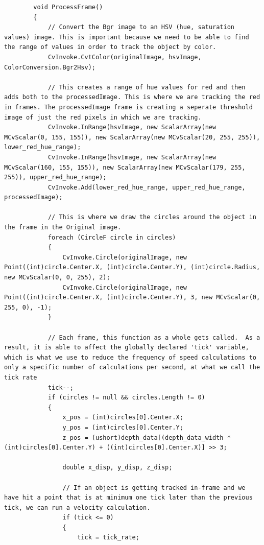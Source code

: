 \documentclass[onecolumn, draftclsnofoot,10pt, compsoc]{IEEEtran}
\begin{document}
\begin{lstlisting}
        void ProcessFrame()
        {
            // Convert the Bgr image to an HSV (hue, saturation values) image. This is important because we need to be able to find the range of values in order to track the object by color.
            CvInvoke.CvtColor(originalImage, hsvImage, ColorConversion.Bgr2Hsv);

            // This creates a range of hue values for red and then adds both to the processedImage. This is where we are tracking the red in frames. The processedImage frame is creating a seperate threshold image of just the red pixels in which we are tracking.
            CvInvoke.InRange(hsvImage, new ScalarArray(new MCvScalar(0, 155, 155)), new ScalarArray(new MCvScalar(20, 255, 255)), lower_red_hue_range);
            CvInvoke.InRange(hsvImage, new ScalarArray(new MCvScalar(160, 155, 155)), new ScalarArray(new MCvScalar(179, 255, 255)), upper_red_hue_range);
            CvInvoke.Add(lower_red_hue_range, upper_red_hue_range, processedImage);

            // This is where we draw the circles around the object in the frame in the Original image.
            foreach (CircleF circle in circles)
            {
                CvInvoke.Circle(originalImage, new Point((int)circle.Center.X, (int)circle.Center.Y), (int)circle.Radius, new MCvScalar(0, 0, 255), 2);
                CvInvoke.Circle(originalImage, new Point((int)circle.Center.X, (int)circle.Center.Y), 3, new MCvScalar(0, 255, 0), -1);
            }

            // Each frame, this function as a whole gets called.  As a result, it is able to affect the globally declared 'tick' variable, which is what we use to reduce the frequency of speed calculations to only a specific number of calculations per second, at what we call the tick rate
            tick--;
            if (circles != null && circles.Length != 0)
            {
                x_pos = (int)circles[0].Center.X;
                y_pos = (int)circles[0].Center.Y;
                z_pos = (ushort)depth_data[(depth_data_width * (int)circles[0].Center.Y) + ((int)circles[0].Center.X)] >> 3;

                double x_disp, y_disp, z_disp;

                // If an object is getting tracked in-frame and we have hit a point that is at minimum one tick later than the previous tick, we can run a velocity calculation.
                if (tick <= 0)
                {
                    tick = tick_rate;


\end{lstlisting}
\end{document}
